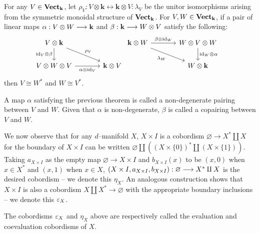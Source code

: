 \begin{lem}\label{vect:nondegen}
For any $V \in \textbf{Vect}_{\mathbf{k}}$, let
$\rho_V : V \otimes \mathbf{k} \longleftrightarrow \mathbf{k} \otimes V :
\lambda_V$ be the unitor isomorphisms arising from the symmetric monoidal
structure of $\textbf{Vect}_{\mathbf{k}}$.
For $V, W \in \textbf{Vect}_{\mathbf{k}}$, if a pair of linear maps
$\alpha : V \otimes W \stackrel{}{\longrightarrow} \mathbf{k}$ and
$\beta : \mathbf{k} \stackrel{}{\longrightarrow} W \otimes V$ satisfy the following:
\begin{eqnarray*}
\begin{tikzcd}[column sep=large]
V \otimes \mathbf{k}
  \arrow[d, "\id_{V} \otimes \beta" left]
  \arrow[rd, "\rho_V" above right] & \\
V \otimes W \otimes V \arrow[r, "\alpha \otimes \id_V" below]
& \mathbf{k} \otimes V
\end{tikzcd} &
\begin{tikzcd}[column sep=large]
\mathbf{k} \otimes W
  \arrow[r, "\beta \otimes \id_{W}" above]
  \arrow[rd, "\lambda_{W}" below left] &
W \otimes V \otimes W \arrow[d, "\id_W \otimes \alpha" right] \\
& W \otimes \mathbf{k}
\end{tikzcd}
\end{eqnarray*}
then $V \cong W^*$ and $W \cong V^*$.
\end{lem}

\begin{defn}\label{vect:nondegen:def}
A map $\alpha$ satisfying the previous theorem is called a non-degenerate
pairing between $V$ and $W$. Given that $\alpha$ is non-degenerate, $\beta$ is
called a copairing between $V$ and $W$.
\end{defn}

We now observe that for any $d$--manifold $X$, $X \times I$ is a cobordism
$\varnothing \to X^* \amalg X$ for the boundary of $X \times I$ can be written
$\varnothing \amalg ((X \times \{0\})^* \amalg (X \times \{1\}))$. Taking
$a_{X \times I}$ as the empty map $\varnothing \to X \times I$ and
$b_{X \times I}(x) $ to be $(x, 0)$ when $x \in X^*$ and $(x, 1)$ when
$x \in X$,
$(X \times I, a_{X \times I}, b_{X \times I}) : \varnothing \stackrel{}{\longrightarrow} X^* \amalg X$
is the desired cobordism -- we denote this $\eta_X$. An analogous construction
shows that $X \times I$ is also a cobordism $X \amalg X^* \to \varnothing$ with
the appropriate boundary inclusions -- we denote this $\varepsilon_X$.

\begin{defn}
The cobordisms $\varepsilon_X$ and $\eta_X$ above are respectively called the
evaluation and coevaluation cobordisms of $X$.
\end{defn}

